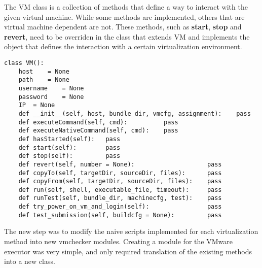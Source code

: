 The VM class is a collection of methods that define a way to interact with the
given virtual machine. While some methods are implemented, others that are
virtual machine dependent are not. These methods, such as \textbf{start}, 
\textbf{stop} and \textbf{revert}, need to be overriden in the 
class that extends VM and implements the object that defines the interaction
with a certain virtualization environment.

\begin{center}
\end{center}


\lstset{caption=Generic VM Implementation, language=python, label=lst:generic-vm}
\begin{lstlisting}
class VM():
    host 	= None
    path 	= None
    username	= None
    password	= None
    IP	= None
    def __init__(self, host, bundle_dir, vmcfg, assignment):    pass
    def executeCommand(self, cmd):          pass
    def executeNativeCommand(self, cmd):    pass
    def hasStarted(self):   pass
    def start(self):        pass
    def stop(self):         pass
    def revert(self, number = None):                    pass
    def copyTo(self, targetDir, sourceDir, files):      pass
    def copyFrom(self, targetDir, sourceDir, files):    pass
    def run(self, shell, executable_file, timeout):     pass
    def runTest(self, bundle_dir, machinecfg, test):    pass
    def try_power_on_vm_and_login(self):                pass
    def test_submission(self, buildcfg = None):         pass
\end{lstlisting}


The new step was to modify the naive scripts implemented for each virtualization
method into new vmchecker modules. Creating a module for the VMware executor
was very simple, and only required translation of the existing methods into a new
class.




